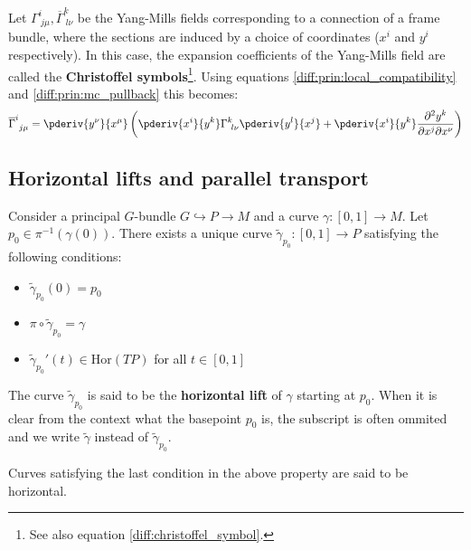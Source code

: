 	\begin{example}
		Let $\Gamma^i_{\ j\mu}, \overline{\Gamma}^k_{\ l\nu}$ be the Yang-Mills fields corresponding to a connection of a frame bundle, where the sections are induced by a choice of coordinates ($x^i$ and $y^i$ respectively). In this case, the expansion coefficients of the Yang-Mills field are called the \textbf{Christoffel symbols}\footnote{See also equation \ref{diff:christoffel_symbol}.}. Using equations \ref{diff:prin:local_compatibility} and \ref{diff:prin:mc_pullback} this becomes:
		\begin{equation}
			\overline{\Gamma}^i_{\ j\mu} = \pderiv{y^\nu}{x^\mu}\left(\pderiv{x^i}{y^k}\Gamma^k_{\ l\nu}\pderiv{y^l}{x^j} + \pderiv{x^i}{y^k}\frac{\partial^2y^k}{\partial x^j\partial x^\nu}\right)
		\end{equation}
	\end{example}

\subsection{Horizontal lifts and parallel transport}
	
	\begin{definition}
		Consider a principal $G$-bundle $G\hookrightarrow P\rightarrow M$ and a curve $\gamma:[0, 1]\rightarrow M$. Let $p_0\in \pi^{-1}(\gamma(0))$. There exists a unique curve $\widetilde{\gamma}_{p_0}:[0, 1]\rightarrow P$ satisfying the following conditions:
		\begin{itemize}
			\item $\widetilde{\gamma}_{p_0}(0) = p_0$
			\item $\pi\circ\widetilde{\gamma}_{p_0} = \gamma$
			\item $\widetilde{\gamma}_{p_0}'(t)\in\text{Hor}(TP)$ for all $t\in[0, 1]$
		\end{itemize}
		The curve $\widetilde{\gamma}_{p_0}$ is said to be the \textbf{horizontal lift} of $\gamma$ starting at $p_0$. When it is clear from the context what the basepoint $p_0$ is, the subscript is often ommited and we write $\widetilde{\gamma}$ instead of $\widetilde{\gamma}_{p_0}$.
	\end{definition}
	\begin{remark}
		Curves satisfying the last condition in the above property are said to be horizontal.
	\end{remark}
	
